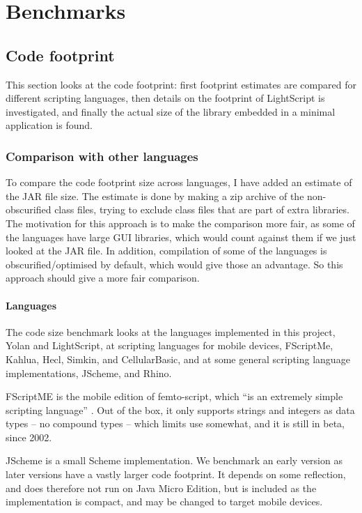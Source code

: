 \documentclass[11pt]{report}
\begin{document}
\chapter{Benchmarks}
\label{benchmark}

\section{Code footprint}
This section looks at the code footprint: first footprint estimates are compared for different scripting languages, then details on the footprint of LightScript is investigated, and finally the actual size of the library embedded in a minimal application is found.

\subsection{Comparison with other languages}
To compare the code footprint size across languages, I have added an estimate of the JAR file size. 
The estimate is done by making a zip archive of the non-obscurified class files,
trying to exclude class files that are part of extra libraries.
The motivation for this approach is to make the comparison more fair, as some of the languages have large GUI libraries,
which would count against them if we just looked at the JAR file. 
In addition, compilation of some of the languages is obscurified/optimised by default,
which would give those an advantage. So this approach should give a more fair comparison.

\subsubsection{Languages}
\label{codefootprint-languages}
The code size benchmark looks at the languages implemented in this project, Yolan and LightScript, at scripting languages for mobile devices, FScriptMe, Kahlua, Hecl, Simkin, and CellularBasic, and at some general scripting language implementations,  JScheme, and Rhino.

FScriptME \cite{fscriptme} is the mobile edition of femto-script, which ``is an extremely simple scripting language'' \cite{fscript}. 
Out of the box, it only supports strings and integers as data types -- no compound types -- which limits use somewhat, and it is still in beta, since 2002. 

JScheme \cite{jscheme} is a small Scheme implementation. We benchmark an early version as later versions have a vastly larger code footprint. It depends on some reflection, and does therefore not run on Java Micro Edition, but is included as the implementation is compact, and may be changed to target mobile devices.
\end{document}
